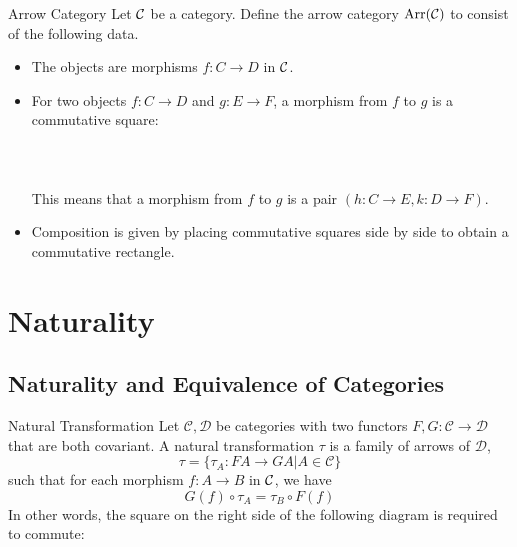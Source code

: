\documentclass[a4paper]{article}
\begin{document}
\begin{defn}{Arrow Category}{} Let $\mathcal{C}$ be a category. Define the arrow category $\text{Arr}(\mathcal{C})$ to consist of the following data. 
\begin{itemize}
\item The objects are morphisms $f:C\to D$ in $\mathcal{C}$. 
\item For two objects $f:C\to D$ and $g:E\to F$, a morphism from $f$ to $g$ is a commutative square: \\~\\
\\~\\
This means that a morphism from $f$ to $g$ is a pair $(h:C\to E,k:D\to F)$. 
\item Composition is given by placing commutative squares side by side to obtain a commutative rectangle. 
\end{itemize}
\end{defn}

\pagebreak
\section{Naturality}
\subsection{Naturality and Equivalence of Categories}
\begin{defn}{Natural Transformation}{} Let $\mathcal{C},\mathcal{D}$ be categories with two functors $F,G:\mathcal{C}\to\mathcal{D}$ that are both covariant. A natural transformation $\tau$ is a family of arrows of $\mathcal{D}$, $$\tau=\{\tau_A:FA\to GA|A\in\mathcal{C}\}$$ such that for each morphism $f:A\to B$ in $\mathcal{C}$, we have 
$$G(f)\circ\tau_A=\tau_B\circ F(f)$$ In other words, the square on the right side of the following diagram is required to commute: \\~\\
\end{defn}
\end{document}
